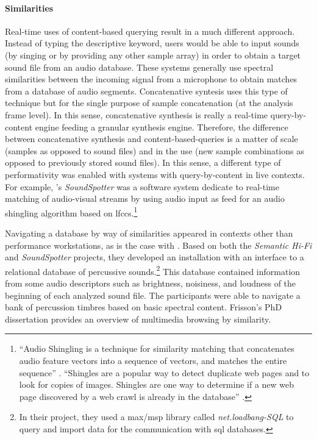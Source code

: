 {	\paragraph{Similarities}
	Real-time uses of content-based querying result in a much different approach. Instead of typing the descriptive keyword, users would be able to input sounds (by singing or by providing any other sample array) in order to obtain a target sound file from an audio database. These systems generally use spectral similarities between the incoming signal from a microphone to obtain matches from a database of audio segments. Concatenative syntesis uses this type of technique but for the single purpose of sample concatenation (at the analysis frame level). In this sense, concatenative synthesis is really a real-time query-by-content engine feeding a granular synthesis engine. Therefore, the difference between concatenative synthesis and content-based-queries is a matter of scale (samples as opposed to sound files) and in the use (new sample combinations as opposed to previously stored sound files). In this sense, a different type of performativity was enabled with systems with query-by-content in live contexts. For example, \citeauthor{DBLP:conf/icmc/CaseyG07}'s \textit{SoundSpotter} \parencite{DBLP:conf/icmc/CaseyG07} was a software system dedicate to real-time matching of audio-visual streams by using audio input as feed for an audio shingling algorithm based on \glspl{lfcc}.\footnote{``Audio Shingling is a technique for similarity matching that concatenates audio feature vectors into a sequence of vectors, and matches the entire sequence'' \parencite{DBLP:conf/icmc/CaseyG07}. ``Shingles are a popular way to detect duplicate web pages and to look for copies of images. Shingles are one way to determine if a new web page discovered by a web crawl is already in the database'' \parencite{DBLP:conf/ismir/CaseyS06}.}


	Navigating a database by way of similarities appeared in contexts other than performance workstations, as is the case with \citeauthor{Price2008} \parencite{Price2008}. Based on both the \textit{Semantic Hi-Fi} and \textit{SoundSpotter} projects, they developed an installation with an interface to a relational database of percussive sounds.\footnote{In their project, they used a \gls{max/msp} library called \textit{net.loadbang-SQL} to query and import data for the communication with \gls{sql} databases.} This database contained information from some audio descriptors such as brightness, noisiness, and loudness of the beginning of each analyzed sound file. The participants were able to navigate a bank of percussion timbres based on basic spectral content. Frisson's PhD dissertation \parencite{Frisson2015} provides an overview of multimedia browsing by similarity.

}
